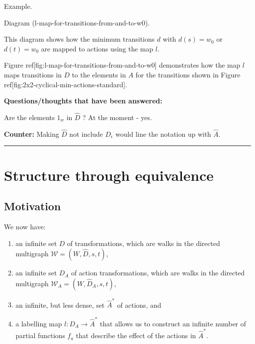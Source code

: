 {\begin{compactitem}
    \item Example.
    \begin{compactitem}
        \item Diagram (l-map-for-transitions-from-and-to-w0).
        \begin{compactitem}
            \item This diagram shows how the minimum transitions $d$ with $d(s) = w_{0}$ or $d(t)= w_{0}$ are mapped to actions using the map $l$.
            \item Figure ref[fig:l-map-for-transitions-from-and-to-w0] demonstrates how the map $l$ maps transitions in $D$ to the elements in $A$ for the transitions shown in Figure ref[fig:2x2-cyclical-min-actions-standard].
        \end{compactitem}
    \end{compactitem}
\end{compactitem}

\textbf{Questions/thoughts that have been answered:}
\begin{compactitem}
    \item Are the elements $1_{w}$ in $\hat{D}$ ? At the moment - yes.
    \begin{compactitem}
        \item \textbf{Counter:} Making $\hat{D}$ not include $D_{\epsilon}$ would line the notation up with $\hat{A}$.
    \end{compactitem}
\end{compactitem}

\noindent\rule{\textwidth}{1mm}
}

\section{Structure through equivalence}
\subsection{Motivation}

We now have:
\begin{enumerate}[(1)]
    \item an infinite set $D$ of transformations, which are walks in the directed multigraph $\mathscr{W}=(W, \hat{D}, s, t)$,
    
    \item an infinite set $D_{A}$ of action transformations, which are walks in the directed multigraph $\mathscr{W}_{A}=(W, \hat{D}_{A}, s, t)$,
    
    \item an infinite, but less dense, set $\hat{A}^{\ast}$ of actions, and

    \item a labelling map $l: D_{A} \to \hat{A}^{\ast}$ that allows us to construct an infinite number of partial functions $f_{a}$ that describe the effect of the actions in $\hat{A}^{\ast}$.
\end{enumerate}

